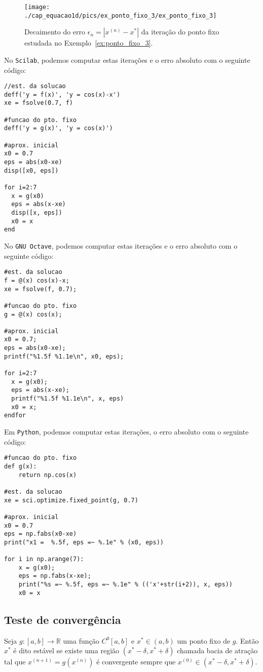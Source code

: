 \begin{sol}
\begin{figure}
  \centering
  \texttt{[image: ./cap\_equacao1d/pics/ex\_ponto\_fixo\_3/ex\_ponto\_fixo\_3]}
  \caption{Decaimento do erro $\epsilon_n = |x^{(n)}-x^*|$ da iteração do ponto fixo estudada no Exemplo~\ref{ex:ponto_fixo_3}.}
  \label{fig:ex_ponto_fixo_3}
\end{figure}


\ifisscilab
No \verb+Scilab+, podemos computar estas iterações e o erro absoluto com o seguinte código:
\begin{verbatim}
//est. da solucao
deff('y = f(x)', 'y = cos(x)-x')
xe = fsolve(0.7, f)

#funcao do pto. fixo
deff('y = g(x)', 'y = cos(x)')

#aprox. inicial
x0 = 0.7
eps = abs(x0-xe)
disp([x0, eps])

for i=2:7
  x = g(x0)
  eps = abs(x-xe)
  disp([x, eps])
  x0 = x
end
\end{verbatim}
\fi
\ifisoctave
No \verb+GNU Octave+, podemos computar estas iterações e o erro absoluto com o seguinte código:
\begin{verbatim}
#est. da solucao
f = @(x) cos(x)-x;
xe = fsolve(f, 0.7);

#funcao do pto. fixo
g = @(x) cos(x);

#aprox. inicial
x0 = 0.7;
eps = abs(x0-xe);
printf("%1.5f %1.1e\n", x0, eps);

for i=2:7
  x = g(x0);
  eps = abs(x-xe);
  printf("%1.5f %1.1e\n", x, eps)
  x0 = x;
endfor
\end{verbatim}
\fi
\ifispython
Em \verb+Python+, podemos computar estas iterações, o erro absoluto com o seguinte código:
\begin{verbatim}
#funcao do pto. fixo
def g(x):
    return np.cos(x)

#est. da solucao
xe = sci.optimize.fixed_point(g, 0.7)

#aprox. inicial
x0 = 0.7
eps = np.fabs(x0-xe)
print("x1 =  %.5f, eps =~ %.1e" % (x0, eps))

for i in np.arange(7):
    x = g(x0);
    eps = np.fabs(x-xe);
    print("%s =~ %.5f, eps =~ %.1e" % (('x'+str(i+2)), x, eps))
    x0 = x
\end{verbatim}
\fi
\end{sol}

\subsection{Teste de convergência}
Seja $g:[a,b]\to\mathbb{R}$ uma função $C^0[a,b]$ e $x^*\in(a,b)$ um ponto fixo de $g$. Então $x^*$ é dito estável se existe uma região $(x^*-\delta,x^*+\delta)$ chamada bacia de atração tal que $x^{(n+1)}=g(x^{(n)})$ é convergente sempre que $x^{(0)}\in(x^*-\delta,x^*+\delta)$.


